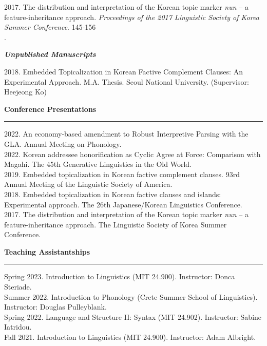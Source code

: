 \documentclass[11pt]{article}
\newcommand{\sect}[1]{{\fontsize{15}{25}\selectfont \textbf{#1}} {\vspace{0.1cm}} \hrule {\vspace{0.3cm}}}
\newcommand{\subsect}[1]{{\fontsize{12}{18}\selectfont \textit{\textbf{#1}}} {\vspace{0.3cm}}}
\begin{document}
{2017. The distribution and interpretation of the Korean topic marker \textit{nun} -- a feature-inheritance approach. \textit{Proceedings of the 2017 Linguistic Society of Korea Summer Conference}. 145-156\\.

\subsect{Unpublished Manuscripts}

2018. Embedded Topicalization in Korean Factive Complement Clauses: An Experimental Approach. M.A. Thesis. Seoul National University. (Supervisor: Heejeong Ko)


{\pagebreak}

\sect{Conference Presentations}

{2022. An economy-based amendment to Robust Interpretive Parsing with the GLA. Annual Meeting on Phonology.}\\

{2022. Korean addressee honorification as Cyclic Agree at Force: Comparison with Magahi. The 45th Generative Linguistics in the Old World.}\\

{2019. Embedded topicalization in Korean factive complement clauses. 93rd Annual Meeting of the Linguistic Society of America.}\\

{2018. Embedded topicalization in Korean factive clauses and islands: Experimental approach. The 26th Japanese/Korean Linguistics Conference.}\\

{2017. The distribution and interpretation of the Korean topic marker \textit{nun} -- a feature-inheritance approach. The Linguistic Society of Korea Summer Conference.}

{\vspace{1cm}}

\sect{Teaching Assistantships}

Spring 2023. Introduction to Linguistics (MIT 24.900). Instructor: Donca Steriade.\\

Summer 2022. Introduction to Phonology (Crete Summer School of Linguistics). Instructor: Douglas Pulleyblank.\\

Spring 2022. Language and Structure II: Syntax (MIT 24.902). Instructor: Sabine Iatridou.\\

Fall 2021. Introduction to Linguistics (MIT 24.900). Instructor: Adam Albright.\\

}
\end{document}
